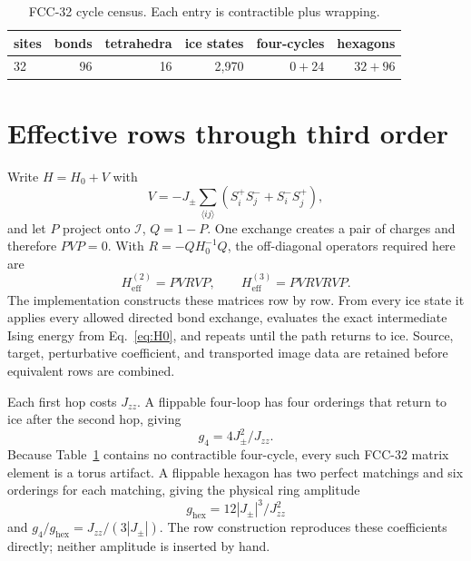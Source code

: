 \documentclass[aps,prl,onecolumn,amsmath,amssymb,superscriptaddress]{revtex4-2}
\newcommand{\Jzz}{J_{zz}}
\newcommand{\Jpm}{J_{\pm}}
\newcommand{\ghex}{g_{\mathrm{hex}}}
\newcommand{\gfour}{g_4}
\newcommand{\ice}{\mathcal I}
\begin{document}
\begin{table}[b]
\caption{FCC-32 cycle census. Each entry is contractible plus wrapping.}
\label{tab:census}
\begin{ruledtabular}
\begin{tabular}{lrrrrr}
sites & bonds & tetrahedra & ice states & four-cycles & hexagons\\
\hline
32 & 96 & 16 & 2,970 & $0+24$ & $32+96$
\end{tabular}
\end{ruledtabular}
\end{table}

\section{Effective rows through third order}
\label{sec:rows}

Write $H=H_0+V$ with
\begin{equation}
 V=-\Jpm\sum_{\langle ij\rangle}
 (S_i^+S_j^-+S_i^-S_j^+),
\end{equation}
and let $P$ project onto $\ice$, $Q=1-P$. One exchange creates a pair of
charges and therefore $PVP=0$. With $R=-QH_0^{-1}Q$, the off-diagonal
operators required here are
\begin{equation}
 H_{\mathrm{eff}}^{(2)}=PVRVP,\qquad
 H_{\mathrm{eff}}^{(3)}=PVRVRVP.
\label{eq:sw23}
\end{equation}
The implementation constructs these matrices row by row. From every ice
state it applies every allowed directed bond exchange, evaluates the exact
intermediate Ising energy from Eq.~\eqref{eq:H0}, and repeats until the path
returns to ice. Source, target, perturbative coefficient, and transported
image data are retained before equivalent rows are combined.

Each first hop costs $\Jzz$. A flippable four-loop has four orderings that
return to ice after the second hop, giving
\begin{equation}
 \gfour=4\Jpm^2/\Jzz.
\end{equation}
Because Table~\ref{tab:census} contains no contractible four-cycle, every
such FCC-32 matrix element is a torus artifact. A flippable hexagon has two
perfect matchings and six orderings for each matching, giving the physical
ring amplitude
\begin{equation}
 \ghex=12|\Jpm|^3/\Jzz^2
\label{eq:ghexSI}
\end{equation}
and $\gfour/\ghex=\Jzz/(3|\Jpm|)$. The row construction reproduces these
coefficients directly; neither amplitude is inserted by hand.
\end{document}

